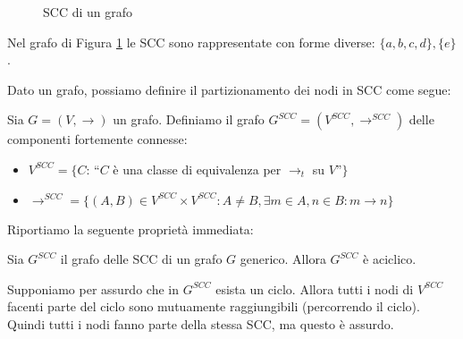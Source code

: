 \begin{example}
    \begin{figure}[t]
        \centering
        \caption{SCC di un grafo}
        \label{fig:graph_cfc_1}
    \end{figure}
    Nel grafo di Figura \ref{fig:graph_cfc_1} le SCC sono rappresentate con forme diverse: $\{a,b,c,d\}, \{e\}$.
\end{example}
Dato un grafo, possiamo definire il partizionamento dei nodi in SCC come segue:
\begin{definition}
    Sia $G = (V, \to)$ un grafo. Definiamo il grafo $G^{SCC} = (V^{SCC}, \to^{SCC})$ delle componenti fortemente connesse:
    \begin{itemize}
        \item $V^{SCC} = \{C : \,$``$C$ è una classe di equivalenza per $\to_t$ su $V$''$\}$
        \item $\to^{SCC} = \{(A,B) \in V^{SCC} \times V^{SCC} : A \neq B, \exists m \in A, n \in B : m \to n\}$
    \end{itemize}
\end{definition}
Riportiamo la seguente proprietà immediata:
\begin{proposition}
    Sia $G^{SCC}$ il grafo delle SCC di un grafo $G$ generico. Allora $G^{SCC}$ è aciclico.
\end{proposition}
\begin{proof2}
    Supponiamo per assurdo che in $G^{SCC}$ esista un ciclo. Allora tutti i nodi di $V^{SCC}$ facenti parte del ciclo sono mutuamente raggiungibili (percorrendo il ciclo). Quindi tutti i nodi fanno parte della stessa SCC, ma questo è assurdo.
\end{proof2}
